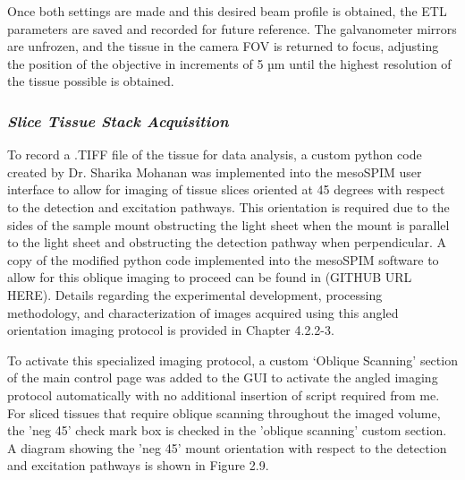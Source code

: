 Once both settings are made and this desired beam profile is obtained, the ETL parameters are saved and recorded for future reference. The galvanometer mirrors are unfrozen, and the tissue in the camera FOV is returned to focus, adjusting the position of the objective in increments of 5 µm until the highest resolution of the tissue possible is obtained.

\subsubsection{\textit{Slice Tissue Stack Acquisition}}
To record a .TIFF file of the tissue for data analysis, a custom python code created by Dr. Sharika Mohanan was implemented into the mesoSPIM user interface to allow for imaging of tissue slices oriented at 45 degrees with respect to the detection and excitation pathways. This orientation is required due to the sides of the sample mount obstructing the light sheet when the mount is parallel to the light sheet and obstructing the detection pathway when perpendicular. A copy of the modified python code implemented into the mesoSPIM software to allow for this oblique imaging to proceed can be found in (GITHUB URL HERE). Details regarding the experimental development, processing methodology, and characterization of images acquired using this angled orientation imaging protocol is provided in Chapter 4.2.2-3.

To activate this specialized imaging protocol, a custom ‘Oblique Scanning’ section of the main control page was added to the GUI to activate the angled imaging protocol automatically with no additional insertion of script required from me. For sliced tissues that require oblique scanning throughout the imaged volume, the 'neg 45' check mark box is checked in the 'oblique scanning' custom section. A diagram showing the 'neg 45' mount orientation with respect to the detection and excitation pathways is shown in Figure 2.9.

